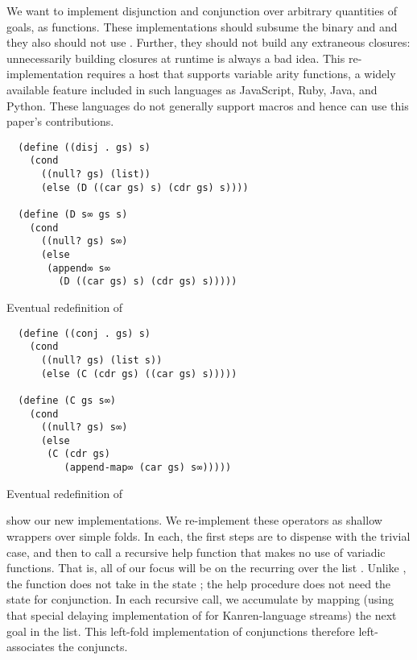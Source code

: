 \documentclass[sigplan,draft,balance,pbalance,natbib=false]{acmart}
\begin{document}
We want to implement disjunction and conjunction over arbitrary
quantities of goals, as functions. These implementations should
subsume the binary  and  and they
also should not use . Further, they should not build
any extraneous closures: unnecessarily building closures at runtime is
always a bad idea. This re-implementation requires a host that
supports variable arity functions, a widely available feature included
in such languages as JavaScript, Ruby, Java, and Python. These
languages do not generally support macros and hence can use this
paper's contributions.

\begin{listing}
  \begin{verbatim}
  (define ((disj . gs) s)
    (cond
      ((null? gs) (list))
      (else (D ((car gs) s) (cdr gs) s))))

  (define (D s∞ gs s)
    (cond
      ((null? gs) s∞)
      (else
       (append∞ s∞
         (D ((car gs) s) (cdr gs) s)))))
  \end{verbatim}
  \caption{Eventual redefinition of }
  \label{mnt:disj-reimplementation}
\end{listing}

\begin{listing}
  \begin{verbatim}
  (define ((conj . gs) s)
    (cond
      ((null? gs) (list s))
      (else (C (cdr gs) ((car gs) s)))))

  (define (C gs s∞)
    (cond
      ((null? gs) s∞)
      (else
       (C (cdr gs)
          (append-map∞ (car gs) s∞)))))
  \end{verbatim}
  \caption{Eventual redefinition of }
  \label{mnt:conj-reimplementation}
\end{listing}

 show our
new implementations. We re-implement these operators as shallow
wrappers over simple folds. In each, the first steps are to dispense
with the trivial case, and then to call a recursive help function that
makes no use of variadic functions. That is, all of our focus will be
on the recurring over the list . Unlike ,
the function  does not take in the state ;
the help procedure does not need the state for conjunction. In each
recursive call, we accumulate by mapping (using that special delaying
implementation of  for Kanren-language
streams) the next goal in the list. This left-fold implementation of
conjunctions therefore left-associates the conjuncts.
\end{document}
